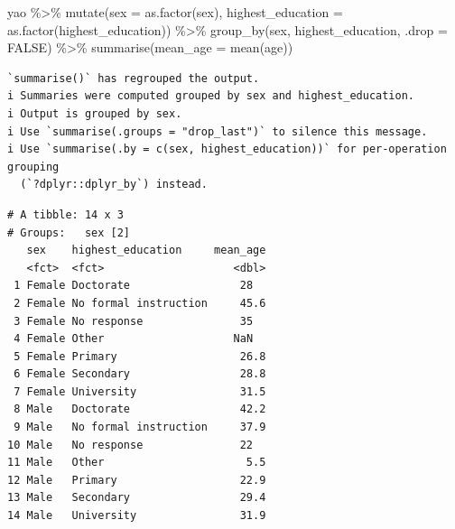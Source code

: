 \documentclass[
  letterpaper,
  DIV=11,
  numbers=noendperiod]{scrreprt}
\newenvironment{Shaded}{\begin{snugshade}}{\end{snugshade}}
\newcommand{\AttributeTok}[1]{\textcolor[rgb]{0.40,0.45,0.13}{#1}}
\newcommand{\ConstantTok}[1]{\textcolor[rgb]{0.56,0.35,0.01}{#1}}
\newcommand{\FunctionTok}[1]{\textcolor[rgb]{0.28,0.35,0.67}{#1}}
\newcommand{\NormalTok}[1]{\textcolor[rgb]{0.00,0.23,0.31}{#1}}
\newcommand{\SpecialCharTok}[1]{\textcolor[rgb]{0.37,0.37,0.37}{#1}}
\begin{document}
\begin{Shaded}
\begin{Highlighting}[]
\NormalTok{yao }\SpecialCharTok{\%\textgreater{}\%} 
  \FunctionTok{mutate}\NormalTok{(}\AttributeTok{sex =} \FunctionTok{as.factor}\NormalTok{(sex), }
         \AttributeTok{highest\_education =} \FunctionTok{as.factor}\NormalTok{(highest\_education)) }\SpecialCharTok{\%\textgreater{}\%} 
  \FunctionTok{group\_by}\NormalTok{(sex, highest\_education, }\AttributeTok{.drop =} \ConstantTok{FALSE}\NormalTok{) }\SpecialCharTok{\%\textgreater{}\%} 
  \FunctionTok{summarise}\NormalTok{(}\AttributeTok{mean\_age =} \FunctionTok{mean}\NormalTok{(age))}
\end{Highlighting}
\end{Shaded}

\begin{verbatim}
`summarise()` has regrouped the output.
i Summaries were computed grouped by sex and highest_education.
i Output is grouped by sex.
i Use `summarise(.groups = "drop_last")` to silence this message.
i Use `summarise(.by = c(sex, highest_education))` for per-operation grouping
  (`?dplyr::dplyr_by`) instead.
\end{verbatim}

\begin{verbatim}
# A tibble: 14 x 3
# Groups:   sex [2]
   sex    highest_education     mean_age
   <fct>  <fct>                    <dbl>
 1 Female Doctorate                 28  
 2 Female No formal instruction     45.6
 3 Female No response               35  
 4 Female Other                    NaN  
 5 Female Primary                   26.8
 6 Female Secondary                 28.8
 7 Female University                31.5
 8 Male   Doctorate                 42.2
 9 Male   No formal instruction     37.9
10 Male   No response               22  
11 Male   Other                      5.5
12 Male   Primary                   22.9
13 Male   Secondary                 29.4
14 Male   University                31.9
\end{verbatim}
\end{document}
